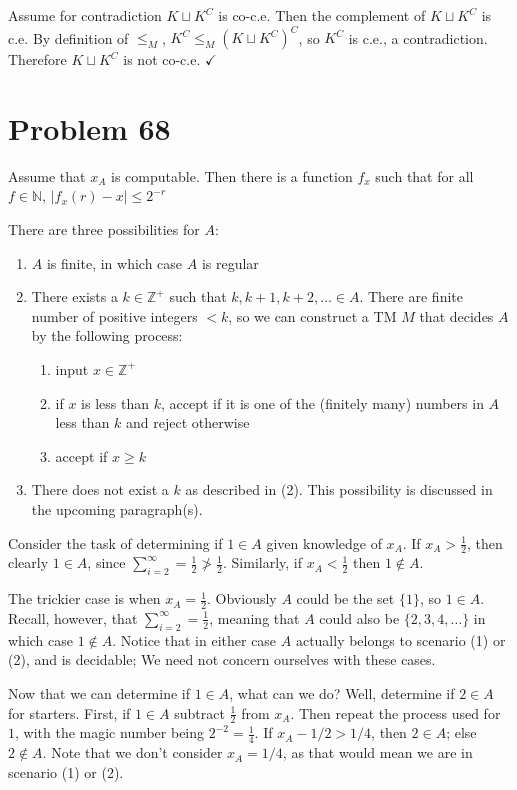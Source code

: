 \documentclass[11pt]{article}
\begin{document}
Assume for contradiction $K \sqcup K^C$ is co-c.e.
Then the complement of $K \sqcup K^C$ is c.e.
By definition of $\leq _M$, $K^C \leq _M (K \sqcup K^C)^C$, so $K^C$ is c.e., a contradiction.
Therefore $K \sqcup K^C$ is not co-c.e. $\checkmark$


\section*{Problem 68}

Assume that $x_A$ is computable. Then there is a function $f_x$ such that for all $f \in \mathbb{N}$, $|f_x(r)-x| \leq 2^{-r}$

There are three possibilities for $A$:
\begin{enumerate}[(1)]
	\item $A$ is finite, in which case $A$ is regular
	\item There exists a $k \in \mathbb{Z}^+$ such that $k, k+1, k+2, \ldots \in A$.
	There are finite number of positive integers $< k$, so we can construct a TM $M$ that decides $A$ by the following process:
	\begin{enumerate}
		\item input $x \in \mathbb{Z}^+$
		\item if $x$ is less than $k$, accept if it is one of the (finitely many) numbers in $A$ less than $k$ and reject otherwise
		\item accept if $x \geq k$
	\end{enumerate}
	\item There does not exist a $k$ as described in (2). This possibility is discussed in the upcoming paragraph(s).
\end{enumerate}

Consider the task of determining if $1 \in A$ given knowledge of $x_A$.
If $x_A > \frac{1}{2}$, then clearly $1 \in A$, since $\sum _{i=2} ^{\infty} = \frac{1}{2} \not> \frac{1}{2}$.
Similarly, if $x_A < \frac{1}{2}$ then $1 \notin A$.

The trickier case is when $x_A = \frac{1}{2}$.
Obviously $A$ could be the set $\{1\}$, so $1 \in A$.
Recall, however, that $\sum _{i=2} ^{\infty} = \frac{1}{2}$, meaning that $A$ could also be $\{2,3,4,\ldots \}$ in which case $1 \notin A$.
Notice that in either case $A$ actually belongs to scenario (1) or (2), and is decidable; We need not concern ourselves with these cases.

Now that we can determine if $1 \in A$, what can we do?
Well, determine if $2 \in A$ for starters.
First, if $1 \in A$ subtract $\frac{1}{2}$ from $x_A$.
Then repeat the process used for $1$, with the magic number being $2^{-2} = \frac{1}{4}$.
If $x_A - 1/2 > 1/4$, then $2 \in A$; else $2 \notin A$.
Note that we don't consider $x_A = 1/4$, as that would mean we are in scenario (1) or (2). 
\end{document}
